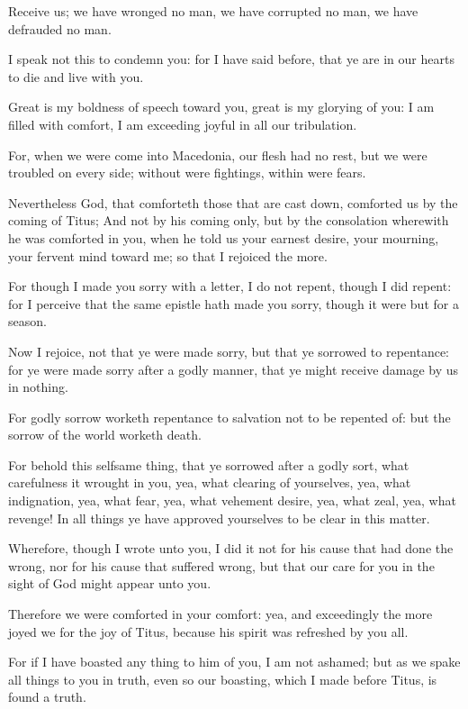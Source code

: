 \verse Receive us; we have wronged no man, we have corrupted no man, we have defrauded no man.

\verse I speak not this to condemn you: for I have said before, that ye are in our hearts to die and live with you.

\verse Great is my boldness of speech toward you, great is my glorying of you: I am filled with comfort, I am exceeding joyful in all our tribulation.

\verse For, when we were come into Macedonia, our flesh had no rest, but we were troubled on every side; without were fightings, within were fears.

\verse Nevertheless God, that comforteth those that are cast down, comforted us by the coming of Titus; \verse And not by his coming only, but by the consolation wherewith he was comforted in you, when he told us your earnest desire, your mourning, your fervent mind toward me; so that I rejoiced the more.

\verse For though I made you sorry with a letter, I do not repent, though I did repent: for I perceive that the same epistle hath made you sorry, though it were but for a season.

\verse Now I rejoice, not that ye were made sorry, but that ye sorrowed to repentance: for ye were made sorry after a godly manner, that ye might receive damage by us in nothing.

\verse For godly sorrow worketh repentance to salvation not to be repented of: but the sorrow of the world worketh death.

\verse For behold this selfsame thing, that ye sorrowed after a godly sort, what carefulness it wrought in you, yea, what clearing of yourselves, yea, what indignation, yea, what fear, yea, what vehement desire, yea, what zeal, yea, what revenge! In all things ye have approved yourselves to be clear in this matter.

\verse Wherefore, though I wrote unto you, I did it not for his cause that had done the wrong, nor for his cause that suffered wrong, but that our care for you in the sight of God might appear unto you.

\verse Therefore we were comforted in your comfort: yea, and exceedingly the more joyed we for the joy of Titus, because his spirit was refreshed by you all.

\verse For if I have boasted any thing to him of you, I am not ashamed; but as we spake all things to you in truth, even so our boasting, which I made before Titus, is found a truth.

